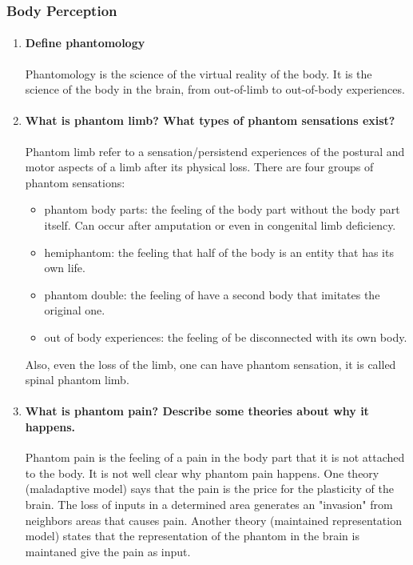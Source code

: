 \documentclass[12pt,article,oneside,a4paper]{memoir}
\begin{document}
\subsubsection{Body Perception}
\begin{enumerate}
\item \paragraph{Define phantomology}
Phantomology is the science of the virtual reality of the body. It is the
science of the body in the brain, from out-of-limb to out-of-body experiences.

\item \paragraph{What is phantom limb? What types of phantom sensations exist?}
Phantom limb refer to a sensation/persistend experiences of the postural and
motor aspects of a limb after its physical loss.
There are four groups of phantom sensations:
\begin{itemize}
\item phantom body parts: the feeling of the body part without the body part
itself. Can occur after amputation or even in congenital limb deficiency.
\item hemiphantom: the feeling that half of the body is an entity that has its
own life.
\item phantom double: the feeling of have a second body that imitates the
original one.
\item out of body experiences: the feeling of be disconnected with its own body.
\end{itemize}

Also, even the loss of the limb, one can have phantom sensation, it is called
spinal phantom limb.

\item \paragraph{What is phantom pain? Describe some theories about why it
happens.}
Phantom pain is the feeling of a pain in the body part that it is not attached
to the body. It is not well clear why phantom pain happens. One theory
(maladaptive model) says that the pain is the price for the plasticity of the
brain. The loss of inputs in a determined area generates an "invasion" from
neighbors areas that causes pain. Another theory (maintained representation
model) states that the representation of the phantom in the brain is maintaned
give the pain as input.


\end{enumerate}
\end{document}
